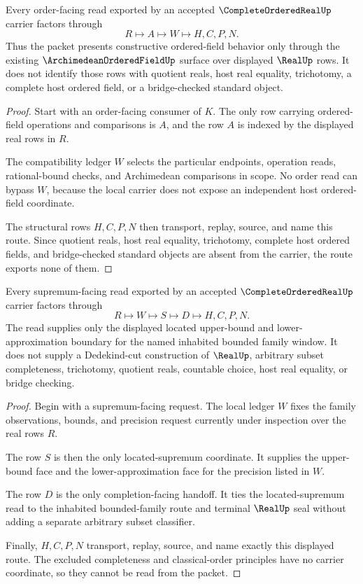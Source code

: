 \begin{theorem}
\label{thm:complete-ordered-real-archimedean-order-route}
Every order-facing read exported by an accepted $\CompleteOrderedRealUp$ carrier factors through
$$
R \longmapsto A \longmapsto W \longmapsto H,C,P,N .
$$
Thus the packet presents constructive ordered-field behavior only through the existing $\ArchimedeanOrderedFieldUp$ surface over displayed $\RealUp$ rows. It does not identify those rows with quotient reals, host real equality, trichotomy, a complete host ordered field, or a bridge-checked standard object.
\end{theorem}
\begin{proof}
Start with an order-facing consumer of $K$. The only row carrying ordered-field operations and comparisons is $A$, and the row $A$ is indexed by the displayed real rows in $R$.

The compatibility ledger $W$ selects the particular endpoints, operation reads, rational-bound checks, and Archimedean comparisons in scope. No order read can bypass $W$, because the local carrier does not expose an independent host ordered-field coordinate.

The structural rows $H,C,P,N$ then transport, replay, source, and name this route. Since quotient reals, host real equality, trichotomy, complete host ordered fields, and bridge-checked standard objects are absent from the carrier, the route exports none of them.
\end{proof}

\begin{theorem}
\label{thm:complete-ordered-real-located-supremum-boundary}
Every supremum-facing read exported by an accepted $\CompleteOrderedRealUp$ carrier factors through
$$
R \longmapsto W \longmapsto S \longmapsto D \longmapsto H,C,P,N .
$$
The read supplies only the displayed located upper-bound and lower-approximation boundary for the named inhabited bounded family window. It does not supply a Dedekind-cut construction of $\RealUp$, arbitrary subset completeness, trichotomy, quotient reals, countable choice, host real equality, or bridge checking.
\end{theorem}
\begin{proof}
Begin with a supremum-facing request. The local ledger $W$ fixes the family observations, bounds, and precision request currently under inspection over the real rows $R$.

The row $S$ is then the only located-supremum coordinate. It supplies the upper-bound face and the lower-approximation face for the precision listed in $W$.

The row $D$ is the only completion-facing handoff. It ties the located-supremum read to the inhabited bounded-family route and terminal $\RealUp$ seal without adding a separate arbitrary subset classifier.

Finally, $H,C,P,N$ transport, replay, source, and name exactly this displayed route. The excluded completeness and classical-order principles have no carrier coordinate, so they cannot be read from the packet.
\end{proof}

